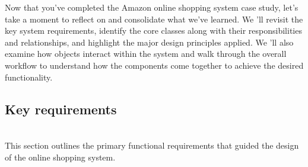 

Now that you've completed the Amazon online shopping system case study, let's take a moment to reflect on and consolidate what we've learned. We 'll revisit the key system requirements, identify the core classes along with their responsibilities and relationships, and highlight the major design principles applied. We
'll also examine how objects interact within the system and walk through the overall workflow to understand how the components come together to achieve the desired functionality.

\subsection{Key requirements}\label{zEU_70b-iTORfcn-1j8bx}
\\
This section outlines the primary functional requirements that guided the design of the online shopping system.

